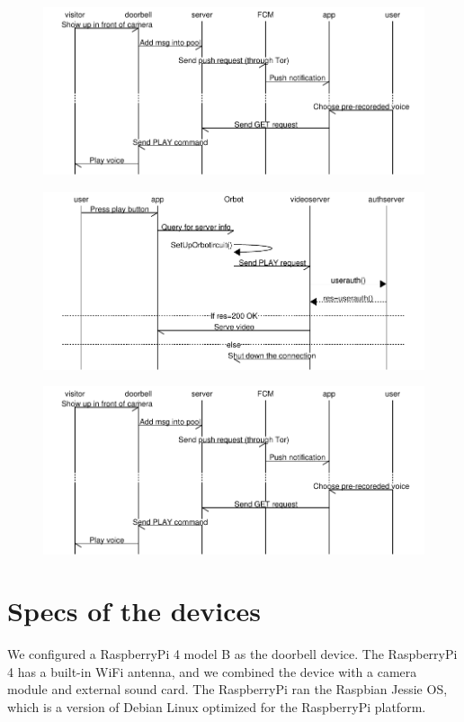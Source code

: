 \begin{figure}
	\includegraphics[width=\linewidth]{Sequence_diagram_push.pdf}
	\caption{}
	\label{fig:pushnotification}
\end{figure}
\begin{figure}
	\includegraphics[width=\linewidth]{Sequence_diagram_playvideo.pdf}
	\caption{}
	\label{fig:playvideo}
\end{figure}
\begin{figure}
	\includegraphics[width=\linewidth]{Sequence_diagram_push.pdf}
	\caption{}
	\label{fig:push}
\end{figure}

\section{Specs of the devices}
We configured a RaspberryPi 4 model B as the doorbell device. The RaspberryPi 4 has a built-in WiFi antenna, and we combined the device with a camera module and external sound card. The RaspberryPi ran the Raspbian Jessie OS, which is a version of Debian Linux optimized for the RaspberryPi platform.

